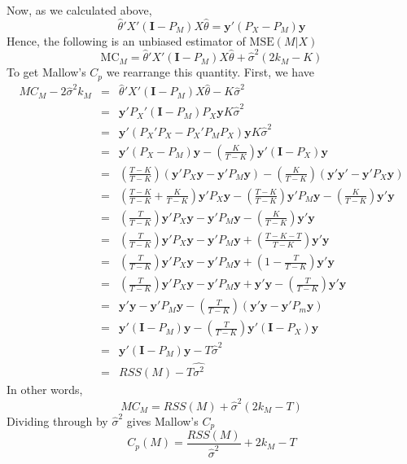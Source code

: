 \documentclass[12pt]{article}
\theoremstyle{definition}
\begin{document}
Now, as we calculated above,
	$$\widehat{\theta}'X'(\mathbf{I} - P_M)X\widehat{\theta} = \textbf{y}'(P_X - P_M)\textbf{y}$$
Hence, the following is an unbiased estimator of $\mbox{MSE}(M|X)$
	$$\mbox{MC}_M = \widehat{\theta}'X'(\mathbf{I} - P_M)X\widehat{\theta} +\widehat{\sigma}^2( 2k_M -  K)$$
To get Mallow's $C_p$ we rearrange this quantity. First, we have
\begin{eqnarray*}
	MC_M - 2\widehat{\sigma}^2k_M &=& \widehat{\theta}'X'(\mathbf{I} - P_M)X\widehat{\theta} - K\widehat{\sigma}^2\\
	&=& \mathbf{y}'P_X'(\mathbf{I} - P_M)P_X \mathbf{y}K\widehat{\sigma}^2\\
	&=&\mathbf{y}'(P_X'P_X - P_X'P_MP_X)\mathbf{y}K\widehat{\sigma}^2\\
	 &=& \mathbf{y}'(P_X - P_M)\mathbf{y} - \left(\frac{K}{T-K}\right)\mathbf{y}'\left(\mathbf{I} - P_X\right)\mathbf{y}\\
		&=& \left(\frac{T-K}{T-K}\right)(\mathbf{y}'P_X\mathbf{y} - \mathbf{y}'P_M\mathbf{y}) - \left(\frac{K}{T-K}\right)(\mathbf{y}'\mathbf{y}' - \mathbf{y}'P_X \mathbf{y})\\
			&=&\left(\frac{T-K}{T-K} + \frac{K}{T-K}\right)\mathbf{y}'P_X \mathbf{y}  - \left(\frac{T-K}{T-K}\right)\mathbf{y}'P_M\mathbf{y} - \left(\frac{K}{T-K}\right)\mathbf{y}'\mathbf{y} \\
			&=&\left(\frac{T}{T-K}\right)\mathbf{y}'P_X \mathbf{y} - \mathbf{y}'P_M\mathbf{y} - \left(\frac{K}{T-K} \right)\mathbf{y}'\mathbf{y}  \\
			&=& \left(\frac{T}{T-K}\right)\mathbf{y}'P_X \mathbf{y} - \mathbf{y}'P_M\mathbf{y} + \left(\frac{T - K - T}{T-K} \right)\mathbf{y}'\mathbf{y}  \\
			&=&  \left(\frac{T}{T-K} \right)\mathbf{y}'P_X \mathbf{y} - \mathbf{y}' P_M \mathbf{y} + \left(1 - \frac{T}{T-K}\right)\mathbf{y}'\mathbf{y} \\
			&=&  \left(\frac{T}{T-K} \right)\mathbf{y}'P_X \mathbf{y} - \mathbf{y}' P_M \mathbf{y} + \mathbf{y}'\mathbf{y} - \left(\frac{T}{T-K}\right)\mathbf{y}'\mathbf{y}  \\
			&=& \mathbf{y}'\mathbf{y} - \mathbf{y}'P_M\mathbf{y} - \left(\frac{T}{T-K} \right)(\mathbf{y}'\mathbf{y} - \mathbf{y}'P_m\mathbf{y})\\
			&=& \mathbf{y}'(\mathbf{I} - P_M)\mathbf{y} - \left(\frac{T}{T-K}\right)\mathbf{y}'\left(\mathbf{I} - P_X\right)\mathbf{y}\\
			&=& \mathbf{y}'(\mathbf{I} - P_M)\mathbf{y} - T\widehat{\sigma}^2\\
			&=& RSS(M) - T\widehat{\sigma^2}
\end{eqnarray*}
In other words,
	$$MC_M = RSS(M) + \widehat{\sigma}^2(2 k_M - T)$$
Dividing through by $\widehat{\sigma}^2$ gives Mallow's $C_p$
	$$C_p(M) = \frac{RSS(M)}{\widehat{\sigma}^2} + 2k_M - T$$
\end{document}

